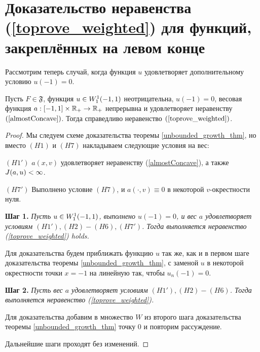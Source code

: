 \section{Доказательство неравенства (\ref{toprove_weighted}) для функций, закреплённых на левом конце}

Рассмотрим теперь случай, когда функция $u$ удовлетворяет дополнительному условию $u(-1) = 0$.
\begin{thm}
Пусть $F \in \mathfrak{F}$, функция $u \in W_1^1(-1, 1)$ неотрицательна, $u(-1) = 0$,
весовая функция $a: [-1, 1] \times \mathbb R_+ \to \mathbb R_+$ непрерывна и удовлетворяет неравенству $(\ref{almostConcave})$.
Тогда справедливо неравенство $(\ref{toprove_weighted})$.
\end{thm}

\begin{proof}
Мы следуем схеме доказательства теоремы \ref{unbounded_growth_thm},
но вместо $(H1)$ и $(H7)$ накладываем следующие условия на вес:

\bigskip
\noindent
$(H1')$ $a(x, v)$ удовлетворяет неравенству (\ref{almostConcave}), а также $J(a, u) < \infty$.

\bigskip
\noindent
$(H7')$ Выполнено условие $(H7)$, и $a(\cdot, v) \equiv 0$ в некоторой $v$-окрестности нуля.

\bigskip
\textbf{Шаг 1.}
\textit{Пусть $u \in W_1^1(-1, 1)$, выполнено $u(-1) = 0$, и вес $a$ удовлетворяет условиям $(H1'), (H2)-(H6), (H7')$.
Тогда выполняется неравенство (\ref{toprove_weighted}) holds.}

Для доказательства будем приближать функцию $u$ так же, как и в первом шаге доказательства теоремы \ref{unbounded_growth_thm},
с заменой $u$ в некоторой окрестности точки $x = -1$ на линейную так, чтобы $u_n(-1) = 0$.

\bigskip
\textbf{Шаг 2.}
\textit{Пусть вес $a$ удовлетворяет условиям $(H1'), (H2)-(H6)$.
Тогда выполняется неравенство (\ref{toprove_weighted}).}

Для доказательства добавим в множество $W$ из второго шага доказательства теоремы \ref{unbounded_growth_thm} точку $0$
и повторим рассуждение.

\medskip

Дальнейшие шаги проходят без изменений.
\end{proof}

